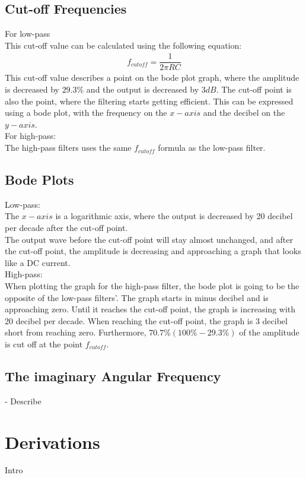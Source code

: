 \subsection{Cut-off Frequencies}
For low-pass \\
This cut-off value can be calculated using the following equation:
\begin{align*}
f_{cutoff}=\dfrac{1}{2 \pi RC}
\end{align*}
This cut-off value describes a point on the bode plot graph, where the amplitude is decreased by $29.3\%$ and the output is decreased by $3dB$. The cut-off point is also the point, where the filtering starts getting efficient. This can be expressed using a bode plot, with the frequency on the $x-axis$ and the decibel on the $y-axis$.\\
For high-pass: \\
The high-pass filters uses the same $f_{cutoff}$ formula as the low-pass filter.

\subsection{Bode Plots}
Low-pass: \\
The $x-axis$ is a logarithmic axis, where the output is decreased by 20 decibel per decade after the cut-off point. \\
The output wave before the cut-off point will stay almost unchanged, and after the cut-off point, the amplitude is decreasing and approaching a graph that looks like a DC current. \\
High-pass: \\
When plotting the graph for the high-pass filter, the bode plot is going to be the opposite of the low-pass filters'. The graph starts in minus decibel and is approaching zero. Until it reaches the cut-off point, the graph is increasing with 20 decibel per decade. When reaching the cut-off point, the graph is 3 decibel short from reaching zero. Furthermore, $70.7\% (100\%-29.3\%)$ of the amplitude is cut off at the point $f_{cutoff}$.
\subsection{The imaginary Angular Frequency}
- Describe
\section{Derivations} \label{Derivations}
Intro 
